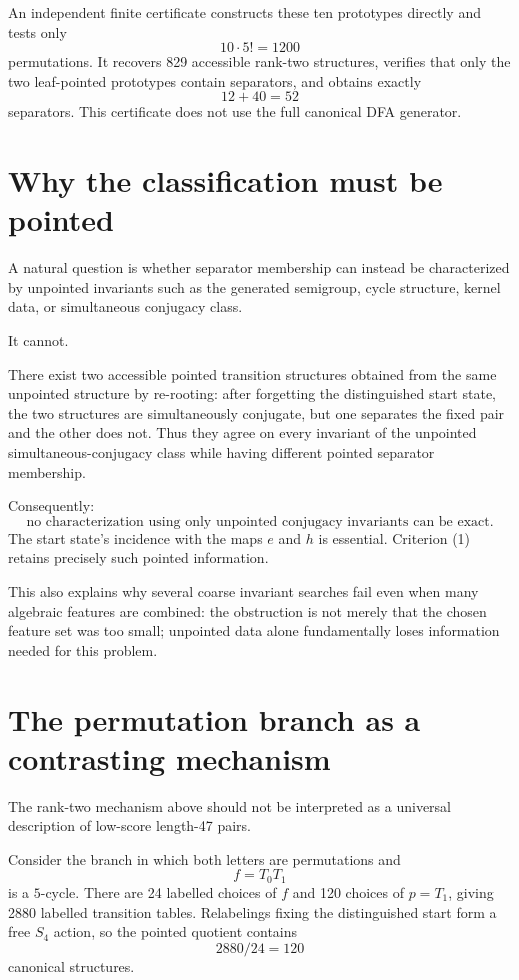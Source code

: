 \documentclass[10pt]{article}
\begin{document}
An independent finite certificate constructs these ten prototypes directly and tests only
\[
10\cdot5!=1200
\]
permutations. It recovers 829 accessible rank-two structures, verifies that only the two leaf-pointed prototypes contain separators, and obtains exactly
\[
12+40=52
\]
separators. This certificate does not use the full canonical DFA generator.

\section{Why the classification must be pointed}

A natural question is whether separator membership can instead be characterized by unpointed invariants such as the generated semigroup, cycle structure, kernel data, or simultaneous conjugacy class.

It cannot.

There exist two accessible pointed transition structures obtained from the same unpointed structure by re-rooting: after forgetting the distinguished start state, the two structures are simultaneously conjugate, but one separates the fixed pair and the other does not. Thus they agree on every invariant of the unpointed simultaneous-conjugacy class while having different pointed separator membership.

Consequently:
\[
\boxed{\text{no characterization using only unpointed conjugacy invariants can be exact.}}
\]
The start state's incidence with the maps $e$ and $h$ is essential. Criterion (1) retains precisely such pointed information.

This also explains why several coarse invariant searches fail even when many algebraic features are combined: the obstruction is not merely that the chosen feature set was too small; unpointed data alone fundamentally loses information needed for this problem.

\section{The permutation branch as a contrasting mechanism}

The rank-two mechanism above should not be interpreted as a universal description of low-score length-47 pairs.

Consider the branch in which both letters are permutations and
\[
f=T_0T_1
\]
is a $5$-cycle. There are 24 labelled choices of $f$ and 120 choices of $p=T_1$, giving 2880 labelled transition tables. Relabelings fixing the distinguished start form a free $S_4$ action, so the pointed quotient contains
\[
2880/24=120
\]
canonical structures.
\end{document}
